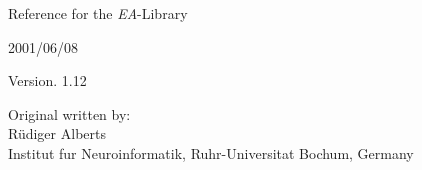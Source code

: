 \begin{LARGE}

{\bf

\begin{center}
Reference for the {\em EA}-Library\\

\vspace*{10mm}    

2001/06/08\\

\vspace*{10mm}
   
Version. 1.12\\

\end{center}

\vspace*{110mm}

\noindent
\begin{center}
{\normalsize Original written by:}\\
R\"udiger Alberts\\
{\normalsize Institut fur Neuroinformatik, Ruhr-Universitat Bochum, Germany}\\
\end{center}
}

\end{LARGE}